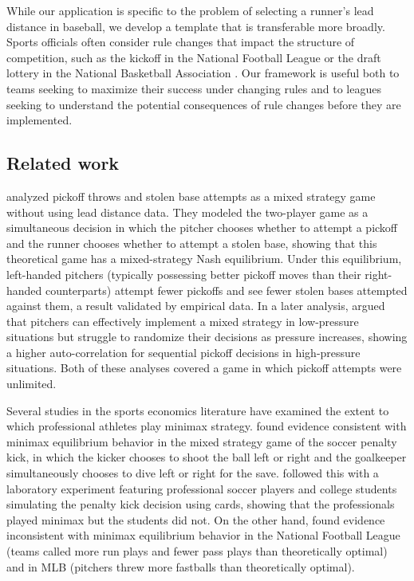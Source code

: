 \documentclass[aoas]{imsart}
\begin{document}
    While our application is specific to the problem of selecting a runner's lead distance in baseball, we develop a template that is transferable more broadly. Sports officials often consider rule changes that impact the structure of competition, such as the kickoff in the National Football League \citep{yousuf_nfls_2026} or the draft lottery in the National Basketball Association \citep{vorkunov_nbas_2026}. Our framework is useful both to teams seeking to maximize their success under changing rules and to leagues seeking to understand the potential consequences of rule changes before they are implemented.

    \subsection{Related work}

    \citet{downey_pick_2015} analyzed pickoff throws and stolen base attempts as a mixed strategy game without using lead distance data. They modeled the two-player game as a simultaneous decision in which the pitcher chooses whether to attempt a pickoff and the runner chooses whether to attempt a stolen base, showing that this theoretical game has a mixed-strategy Nash equilibrium. Under this equilibrium, left-handed pitchers (typically possessing better pickoff moves than their right-handed counterparts) attempt fewer pickoffs and see fewer stolen bases attempted against them, a result validated by empirical data. In a later analysis, \citet{downey_pressure_2019} argued that pitchers can effectively implement a mixed strategy in low-pressure situations but struggle to randomize their decisions as pressure increases, showing a higher auto-correlation for sequential pickoff decisions in high-pressure situations. Both of these analyses covered a game in which pickoff attempts were unlimited.

    Several studies in the sports economics literature have examined the extent to which professional athletes play minimax strategy. \citet{palacios-huerta_professionals_2003} found evidence consistent with minimax equilibrium behavior in the mixed strategy game of the soccer penalty kick, in which the kicker chooses to shoot the ball left or right and the goalkeeper simultaneously chooses to dive left or right for the save. \citet{palacios-huerta_experientia_2008} followed this with a laboratory experiment featuring professional soccer players and college students simulating the penalty kick decision using cards, showing that the professionals played minimax but the students did not. On the other hand, \citet{kovash_professionals_2009} found evidence inconsistent with minimax equilibrium behavior in the National Football League (teams called more run plays and fewer pass plays than theoretically optimal) and in MLB (pitchers threw more fastballs than theoretically optimal).
\end{document}
